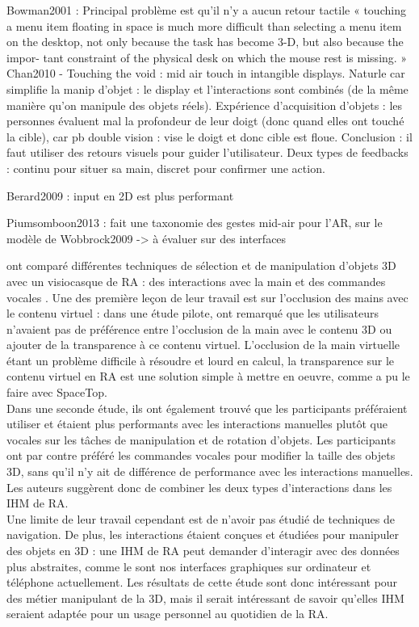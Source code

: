Bowman2001 : Principal problème est qu'il n'y a aucun retour tactile « touching a menu item floating in space is much more difficult than selecting a menu item on the desktop, not only because the task has become 3-D, but also because the impor- tant constraint of the physical desk on which the mouse rest is missing. »\\
Chan2010 - Touching the void : mid air touch in intangible displays. Naturle car simplifie la manip d'objet : le display et l'interactions sont combinés (de la même manière qu'on manipule des objets réels). Expérience d'acquisition d'objets : les personnes évaluent mal la profondeur de leur doigt (donc quand elles ont touché la cible), car pb double vision : vise le doigt et donc cible est floue. Conclusion : il faut utiliser des retours visuels pour guider l'utilisateur. Deux types de feedbacks : continu pour situer sa main, discret pour confirmer une action.

Berard2009 : input en 2D est plus performant

Piumsomboon2013 : fait une taxonomie des gestes mid-air pour l'AR, sur le modèle de Wobbrock2009 -> à évaluer sur des interfaces

\cite{Piumsomboon2014} ont comparé différentes techniques de sélection et de manipulation d'objets 3D avec un visiocasque de RA : des interactions avec la main et des commandes vocales . Une des première leçon de leur travail est sur l'occlusion des mains avec le contenu virtuel : dans une étude pilote, \citeauthor{Piumsomboon2014} ont remarqué que les utilisateurs n'avaient pas de préférence entre l'occlusion de la main avec le contenu 3D ou ajouter de la transparence à ce contenu virtuel. L'occlusion de la main virtuelle étant un problème difficile à résoudre et lourd en calcul, la transparence sur le contenu virtuel en RA est une solution simple à mettre en oeuvre, comme a pu le faire \cite{Lee2013} avec SpaceTop.\\
Dans une seconde étude, ils ont également trouvé que les participants préféraient utiliser et étaient plus performants avec les interactions manuelles plutôt que vocales sur les tâches de manipulation et de rotation d'objets. Les participants ont par contre préféré les commandes vocales pour modifier la taille des objets 3D, sans qu'il n'y ait de différence de performance avec les interactions manuelles. Les auteurs suggèrent donc de combiner les deux types d'interactions dans les IHM de RA.\\
Une limite de leur travail cependant est de n'avoir pas étudié de techniques de navigation. De plus, les interactions étaient conçues et étudiées pour manipuler des objets en 3D : une IHM de RA peut demander d'interagir avec des données plus abstraites, comme le sont nos interfaces graphiques sur ordinateur et téléphone actuellement. Les résultats de cette étude sont donc intéressant pour des métier manipulant de la 3D, mais il serait intéressant de savoir qu'elles IHM seraient adaptée pour un usage personnel au quotidien de la RA.

